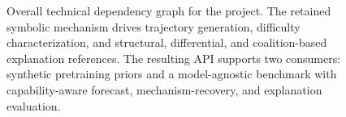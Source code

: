 \begin{landscape}
\begin{figure}[H]
    \centering
    \resizebox{0.77\linewidth}{!}{%
    }
    \caption{Overall technical dependency graph for the project.  The retained
    symbolic mechanism drives trajectory generation, difficulty characterization,
    and structural, differential, and coalition-based explanation references.  The
    resulting API supports two consumers: synthetic pretraining priors and a
    model-agnostic benchmark with capability-aware forecast, mechanism-recovery,
    and explanation evaluation.}
    \label{fig:project-dependency-graph}
\end{figure}
\end{landscape}

\begingroup
\small
\setlength{\LTpre}{0.4\baselineskip}
\setlength{\LTpost}{0.7\baselineskip}
\renewcommand{\arraystretch}{1.08}

